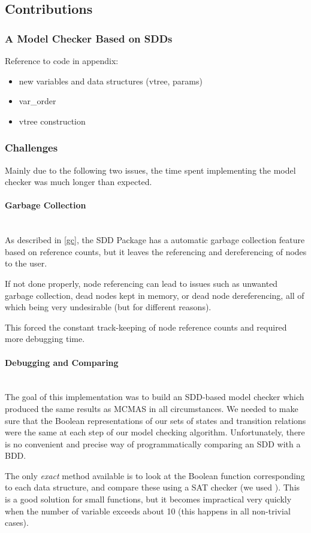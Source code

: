 \documentclass[12]{article}
\newcommand{\myparagraph}[1]{\paragraph{#1}\mbox{}\\}
\begin{document}
\subsection{Contributions}

\subsubsection{A Model Checker Based on SDDs}

Reference to code in appendix:
\begin{itemize}
\item new variables and data structures (vtree, params)
\item var\_order
\item vtree construction 
\end{itemize}

\subsubsection{Challenges}

Mainly due to the following two issues, the time spent implementing the model checker was much longer than expected.

\myparagraph{Garbage Collection}

As described in \ref{gc}, the SDD Package has a automatic garbage collection feature based on reference counts, but it leaves the referencing and dereferencing of nodes to the user. 

If not done properly, node referencing can lead to issues such as unwanted garbage collection, dead nodes kept in memory, or dead node dereferencing, all of which being very undesirable (but for different reasons).

This forced the constant track-keeping of node reference counts and required more debugging time. 

\myparagraph{Debugging and Comparing}

The goal of this implementation was to build an SDD-based model checker which produced the same results as MCMAS in all circumstances. We needed to make sure that the Boolean representations of our sets of states and transition relations were the same at each step of our model checking algorithm. Unfortunately, there is no convenient and precise way of programmatically comparing an SDD with a BDD. 

The only \textit{exact} method available is to look at the Boolean function corresponding to each data structure, and compare these using a SAT checker (we used \cite{minisat}). This is a good solution for small functions, but it becomes impractical very quickly when the number of variable exceeds about 10 (this happens in all non-trivial cases).  
\end{document}
